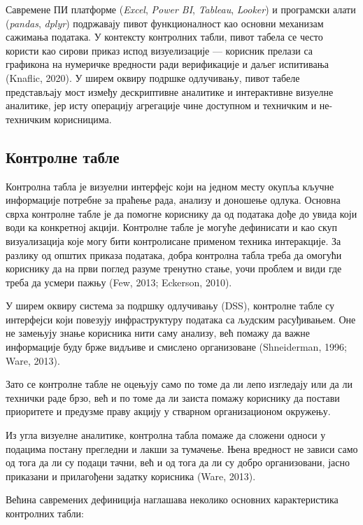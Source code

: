 Савремене ПИ платформе (\textit{Excel}, \textit{Power BI}, \textit{Tableau}, \textit{Looker}) и програмски алати (\textit{pandas}, \textit{dplyr}) подржавају пивот функционалност као основни механизам сажимања података. У контексту контролних табли, пивот табела се често користи као сирови приказ испод визуелизације — корисник прелази са графикона на нумеричке вредности ради верификације и даљег испитивања (Knaflic, 2020). У ширем оквиру подршке одлучивању, пивот табеле представљају мост између дескриптивне аналитике и интерактивне визуелне аналитике, јер исту операцију агрегације чине доступном и техничким и не-техничким корисницима.

\subsection{Контролне табле}
Контролна табла је визуелни интерфејс који на једном месту окупља кључне информације потребне за праћење рада, анализу и доношење одлука. Основна сврха контролне табле је да помогне кориснику да од података дође до увида који води ка конкретној акцији. Контролне табле је могуће дефинисати и као скуп визуализација које могу бити контролисане применом техника интеракције. За разлику од општих приказа података, добра контролна табла треба да омогући кориснику да на први поглед разуме тренутно стање, уочи проблем и види где треба да усмери пажњу (Few, 2013; Eckerson, 2010).

У ширем оквиру система за подршку одлучивању (DSS), контролне табле су интерфејси који повезују инфраструктуру података са људским расуђивањем. Оне не замењују знање корисника нити саму анализу, већ помажу да важне информације буду брже видљиве и смислено организоване (Shneiderman, 1996; Ware, 2013).

Зато се контролне табле не оцењују само по томе да ли лепо изгледају или да ли технички раде брзо, већ и по томе да ли заиста помажу кориснику да постави приоритете и предузме праву акцију у стварном организационом окружењу.

Из угла визуелне аналитике, контролна табла помаже да сложени односи у подацима постану прегледни и лакши за тумачење. Њена вредност не зависи само од тога да ли су подаци тачни, већ и од тога да ли су добро организовани, јасно приказани и прилагођени задатку корисника (Ware, 2013).

Већина савремених дефиниција наглашава неколико основних карактеристика контролних табли:

